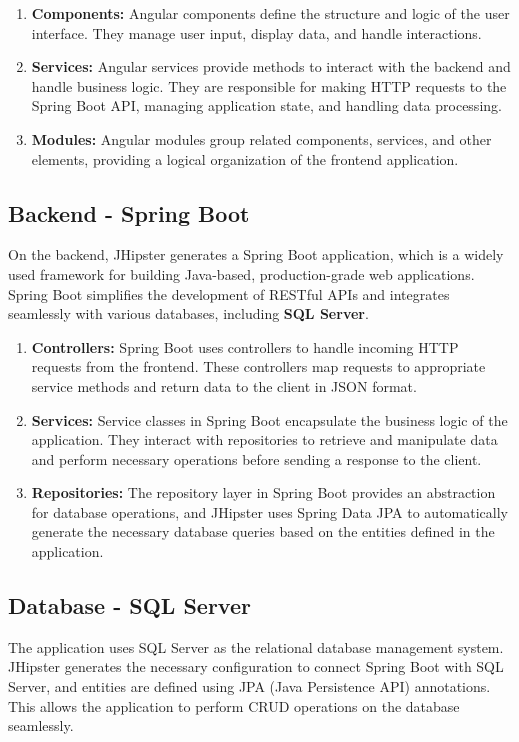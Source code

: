 \documentclass[a4paper,11pt,openright,BCOR=15mm]{scrbook}
\begin{document}
		\begin{enumerate}
			\item \textbf{Components:} Angular components define the structure and logic of the user interface. They manage user input, display data, and handle interactions.
			\item \textbf{Services:} Angular services provide methods to interact with the backend and handle business logic. They are responsible for making HTTP requests to the Spring Boot API, managing application state, and handling data processing.
			\item \textbf{Modules:} Angular modules group related components, services, and other elements, providing a logical organization of the frontend application.
		\end{enumerate}
		
		\subsection{Backend  - Spring Boot}
		On the backend, JHipster generates a Spring Boot application, which is a widely used framework for building Java-based, production-grade web applications. Spring Boot simplifies the development of RESTful APIs and integrates seamlessly with various databases, including \textbf{SQL Server}.
		
		\begin{enumerate}
			\item \textbf{Controllers:} Spring Boot uses controllers to handle incoming HTTP requests from the frontend. These controllers map requests to appropriate service methods and return data to the client in JSON format.
			\item \textbf{Services:} Service classes in Spring Boot encapsulate the business logic of the application. They interact with repositories to retrieve and manipulate data and perform necessary operations before sending a response to the client.
			\item \textbf{Repositories:} The repository layer in Spring Boot provides an abstraction for database operations, and JHipster uses Spring Data JPA to automatically generate the necessary database queries based on the entities defined in the application.
		\end{enumerate}
		
		\subsection{Database - SQL Server}
		The application uses SQL Server as the relational database management system. JHipster generates the necessary configuration to connect Spring Boot with SQL Server, and entities are defined using JPA (Java Persistence API) annotations. This allows the application to perform CRUD operations on the database seamlessly.
		
\end{document}
